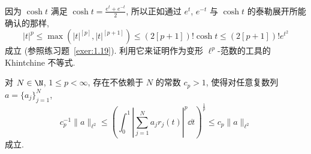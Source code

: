 因为 $\cosh t$ 满足 $\cosh t = \frac{e^{t} + e^{-t}}{2}$, 所以正如通过 $e^{t}$, $e^{-t}$ 与 $\cosh t$ 的泰勒展开所能确认的那样,
\begin{equation}\tag{1.9}\label{eq:1.9}
|t|^{p} \leq \max(|t|^{[p]}, |t|^{[p+1]}) \leq (2[p+1])! \cosh t \leq (2[p+1])! e^{t^{2}}
\end{equation}
成立 (参照练习题~\ref{exer:1.19}). 利用它来证明作为变形 $\ell^{p}$-范数的工具的 Khintchine 不等式.

\begin{theorem}\label{thm:1.6}
对 $N \in \N$, $1 \leq p < \infty$, 存在不依赖于 $N$ 的常数 $c_{p} > 1$, 使得对任意复数列 $a = \{a_{j}\}_{j=1}^{N}$,
\begin{equation}\tag{1.10}\label{eq:1.10}
c_{p}^{-1}\| a \|_{\ell^{2}} \leq \left(\int_{0}^{1} \left| \sum_{j=1}^{N} a_{j}r_{j}(t) \right|^{p} \dd t\right)^{\frac{1}{p}} \leq c_{p}\| a \|_{\ell^{2}}
\end{equation}
成立.
\end{theorem}

